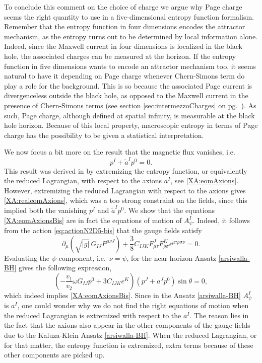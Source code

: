 \documentclass[12pt,twoside]{book}
\begin{document}
To conclude this comment on the choice of charge we argue why Page charge seems the right quantity to use in a five-dimensional entropy function formalism. 
Remember that the entropy function in four dimensions encodes the attractor mechanism, as the entropy turns out to be determined by local information alone. Indeed, since the Maxwell current in four dimensions is localized in the black hole, the associated charges can be measured at the horizon. If the entropy function in five dimensions wants to encode an attractor mechanism too, it seems natural to have it depending on Page charge whenever Chern-Simons term do play a role for the background. This is so because the associated Page current is divergenceless outside the black hole, as opposed to the Maxwell current in the presence of Chern-Simons terms (see section \ref{sec:intermezzoCharges} on pg.\ \pageref{sec:intermezzoCharges}). As such, Page charge, although defined at spatial infinity, is measurable at the black hole horizon. Because of this local property, macroscopic entropy in terms of Page charge has the possibility to be given a statistical interpretation.\newline

We now focus a bit more on the result that the magnetic flux vanishes, i.e.\
\begin{equation}\label{XA:eomAxionsBis}
p^{I} + \tilde{a}^{I} p^{0} = 0.
\end{equation}
This result was derived in \cite{Arsiwalla:2008gc} by extremizing the entropy function, or equivalently the reduced Lagrangian, with respect to the axions $a^{I}$, see \eqref{XA:eomAxions}. However, extremizing the reduced Lagrangian with respect to the axions gives \eqref{XA:realeomAxions}, which was a too strong constraint on the fields, since this implied both the vanishing $p^{I}$ and $\tilde{a}^{I} p^{0}$. We show that the equations \eqref{XA:eomAxionsBis} are in fact the equations of motion of $A^{I}_{\psi}$. Indeed, it follows from the action \eqref{eq:actionN2D5-bis} that the gauge fields satisfy
\begin{equation}
\partial_{\mu} \left( \sqrt{|g|} \,G_{IJ} F^{\mu\nu J} \right) + \frac{3}{8}
C_{IJK} F^{J}_{\mu\tau} F^{K}_{\rho\sigma} \epsilon^{\mu\tau\rho\sigma\nu} = 0.
\end{equation}
Evaluating the $\psi$-component, i.e.\ $\nu = \psi$, for the near horizon Ansatz \eqref{arsiwalla-BH} gives the following expression,
\begin{equation}
(- \frac{v_{1}}{v_{2}} \omega G_{IJ} p^{0} + 3 C_{IJK} e^{K}) (p^{J} + a^{J} p^{0} ) \sin\theta  = 0,
\end{equation}
which indeed implies \eqref{XA:eomAxionsBis}. Since in the Ansatz \eqref{arsiwalla-BH} $A^{I}_{\psi}$ is $a^{I}$, one could wonder why we do not find the right equations of motion when the reduced Lagrangian is extremized with respect to the $a^{I}$. The reason lies in the fact that the axions also appear in the other components of the gauge fields due to the Kaluza-Klein Ansatz \eqref{arsiwalla-BH}. When the reduced Lagrangian, or for that matter, the entropy function is extremized, extra terms because of these other components are picked up.
\end{document}
